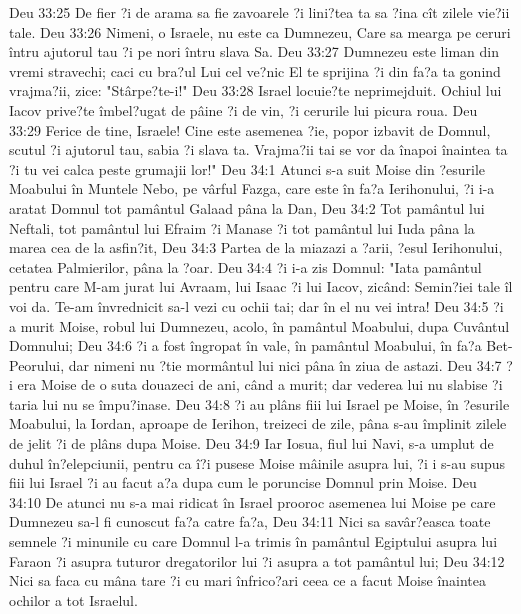 Deu 33:25  De fier ?i de arama sa fie zavoarele ?i lini?tea ta sa ?ina cît zilele vie?ii tale.
Deu 33:26  Nimeni, o Israele, nu este ca Dumnezeu, Care sa mearga pe ceruri întru ajutorul tau ?i pe nori întru slava Sa.
Deu 33:27  Dumnezeu este liman din vremi stravechi; caci cu bra?ul Lui cel ve?nic El te sprijina ?i din fa?a ta gonind vrajma?ii, zice: "Stârpe?te-i!"
Deu 33:28  Israel locuie?te neprimejduit. Ochiul lui Iacov prive?te îmbel?ugat de pâine ?i de vin, ?i cerurile lui picura roua.
Deu 33:29  Ferice de tine, Israele! Cine este asemenea ?ie, popor izbavit de Domnul, scutul ?i ajutorul tau, sabia ?i slava ta. Vrajma?ii tai se vor da înapoi înaintea ta ?i tu vei calca peste grumajii lor!"
Deu 34:1  Atunci s-a suit Moise din ?esurile Moabului în Muntele Nebo, pe vârful Fazga, care este în fa?a Ierihonului, ?i i-a aratat Domnul tot pamântul Galaad pâna la Dan,
Deu 34:2  Tot pamântul lui Neftali, tot pamântul lui Efraim ?i Manase ?i tot pamântul lui Iuda pâna la marea cea de la asfin?it,
Deu 34:3  Partea de la miazazi a ?arii, ?esul Ierihonului, cetatea Palmierilor, pâna la ?oar.
Deu 34:4  ?i i-a zis Domnul: "Iata pamântul pentru care M-am jurat lui Avraam, lui Isaac ?i lui Iacov, zicând: Semin?iei tale îl voi da. Te-am învrednicit sa-l vezi cu ochii tai; dar în el nu vei intra!
Deu 34:5  ?i a murit Moise, robul lui Dumnezeu, acolo, în pamântul Moabului, dupa Cuvântul Domnului;
Deu 34:6  ?i a fost îngropat în vale, în pamântul Moabului, în fa?a Bet-Peorului, dar nimeni nu ?tie mormântul lui nici pâna în ziua de astazi.
Deu 34:7  ?i era Moise de o suta douazeci de ani, când a murit; dar vederea lui nu slabise ?i taria lui nu se împu?inase.
Deu 34:8  ?i au plâns fiii lui Israel pe Moise, în ?esurile Moabului, la Iordan, aproape de Ierihon, treizeci de zile, pâna s-au împlinit zilele de jelit ?i de plâns dupa Moise.
Deu 34:9  Iar Iosua, fiul lui Navi, s-a umplut de duhul în?elepciunii, pentru ca î?i pusese Moise mâinile asupra lui, ?i i s-au supus fiii lui Israel ?i au facut a?a dupa cum le poruncise Domnul prin Moise.
Deu 34:10  De atunci nu s-a mai ridicat în Israel prooroc asemenea lui Moise pe care Dumnezeu sa-l fi cunoscut fa?a catre fa?a,
Deu 34:11  Nici sa savâr?easca toate semnele ?i minunile cu care Domnul l-a trimis în pamântul Egiptului asupra lui Faraon ?i asupra tuturor dregatorilor lui ?i asupra a tot pamântul lui;
Deu 34:12  Nici sa faca cu mâna tare ?i cu mari înfrico?ari ceea ce a facut Moise înaintea ochilor a tot Israelul.


